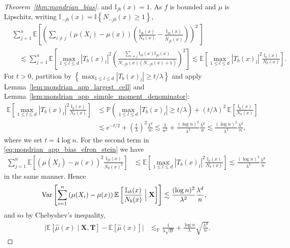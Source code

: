 \documentclass[11pt,lof]{puthesis}
\renewcommand{\P}{\ensuremath{\mathbb{P}}}
\newcommand{\E}{\ensuremath{\mathbb{E}}}
\newcommand{\I}{\ensuremath{\mathbb{I}}}
\newcommand{\bX}{\ensuremath{\mathbf{X}}}
\newcommand{\bT}{\ensuremath{\mathbf{T}}}
\DeclareMathOperator{\Var}{Var}
\theoremstyle{break}
\theoremstyle{proof}
\newtheorem{proof}{Proof}
\begin{document}
\begin{proof}[Theorem~\ref{thm:mondrian_bias}]
  and $\I_{j b}(x) = 1$.
  As $f$ is bounded and $\mu$ is Lipschitz,
  writing $\I_{-j b}(x) = \I \left\{ N_{-j b}(x) \geq 1 \right\}$,
  \begin{align*}
    &\sum_{j=1}^{n}
    \E \left[
      \left(
        \sum_{i \neq j}
        \left( \mu(X_i) - \mu(x) \right)
        \left(
          \frac{\I_{i b}(x)}{N_b(x)} - \frac{\I_{i b}(x)}{\tilde N_{j b}(x)}
        \right)
      \right)^{\! 2} \,
    \right] \\
    &\quad\lesssim
    \sum_{j=1}^{n}
    \E \left[
      \max_{1 \leq l \leq d}
      |T_b(x)_l|^2
      \left(
        \frac{\sum_{i \neq j}\I_{i b}(x) \I_{j b}(x)}
        {N_{-j b}(x)(N_{-j b}(x) + 1)}
      \right)^2
    \right]
    \lesssim
    \E \left[
      \max_{1 \leq l \leq d}
      |T_b(x)_l|^2
      \frac{\I_{b}(x)}{N_{b}(x)}
    \right].
  \end{align*}
  For $t > 0$, partition by
  $\left\{ \max_{1 \leq l \leq d} |T_b(x)_l| \geq t/\lambda \right\}$
  and apply Lemma~\ref{lem:mondrian_app_largest_cell} and
  Lemma~\ref{lem:mondrian_app_simple_moment_denominator}:
  \begin{align*}
    \E \left[
      \max_{1 \leq l \leq d}
      |T_b(x)_l|^2
      \frac{\I_{b}(x)}{N_{b}(x)}
    \right]
    &\leq
    \P \left(
      \max_{1 \leq l \leq d} |T_b(x)_l| \geq t/\lambda
    \right)
    + (t / \lambda)^2\,
    \E \left[
      \frac{\I_{b}(x)}{N_{b}(x)}
    \right] \\
    &\lesssim
    e^{-t/2}
    + \left( \frac{t}{\lambda} \right)^2
    \frac{\lambda^d}{n}
    \lesssim
    \frac{1}{n^2}
    + \frac{(\log n)^2}{\lambda^2}
    \frac{\lambda^d}{n}
    \lesssim
    \frac{(\log n)^2}{\lambda^2}
    \frac{\lambda^{d}}{n},
  \end{align*}
  where we set $t = 4 \log n$.
  For the second term in \eqref{eq:mondrian_app_bias_efron_stein} we have
  \begin{align*}
    \sum_{j=1}^{n}
    \E \left[
      \left( \mu(X_j) - \mu(x) \right)^2
      \frac{\I_{j b}(x)}{N_b(x)^2}
    \right]
    &\lesssim
    \E \left[
      \max_{1 \leq l \leq d}
      |T_b(x)_l|^{2}
      \frac{\I_{b}(x)}{N_b(x)}
    \right]
    \lesssim
    \frac{(\log n)^2}{\lambda^2}
    \frac{\lambda^{d}}{n}
  \end{align*}
  in the same manner.
  Hence
  \begin{align*}
    \Var \left[
      \sum_{i=1}^{n}
      \left( \mu(X_i) - \mu(x) \right)
      \E \left[
        \frac{\I_{i b}(x)}{N_b(x)}
        \Bigm| \bX
      \right]
    \right]
    &\lesssim
    \frac{(\log n)^2}{\lambda^2}
    \frac{\lambda^{d}}{n},
  \end{align*}
  and so by Chebyshev's inequality,
  \begin{align*}
    \big|
    \E \left[ \hat \mu(x) \mid \bX, \bT \right]
    - \E \left[ \hat \mu(x) \right]
    \big|
    &\lesssim_\P
    \frac{1}{\lambda \sqrt B}
    + \frac{\log n}{\lambda}
    \sqrt{ \frac{\lambda^{d}}{n} }.
  \end{align*}


\end{proof}
\end{document}
